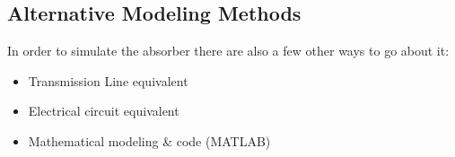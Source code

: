     \subsection{\textsf{Alternative Modeling Methods}}
        In order to simulate the absorber there are also a few other ways to go about it:
        \begin{itemize}
            \item Transmission Line equivalent
            \item Electrical circuit equivalent
            \item Mathematical modeling \& code (MATLAB)
        \end{itemize}